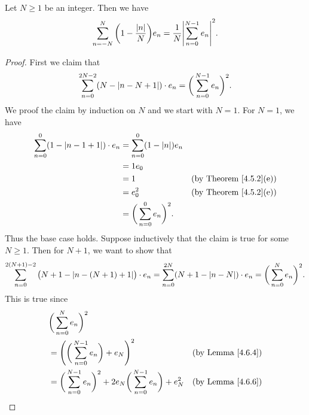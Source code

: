 \begin{additional corollary}\label{ac 5.4.2}
Let \(N \geq 1\) be an integer.
Then we have
\[
    \sum_{n = -N}^N \bigg(1 - \frac{\abs*{n}}{N}\bigg) e_n = \frac{1}{N} \abs*{\sum_{n = 0}^{N - 1} e_n}^2.
\]
\end{additional corollary}

\begin{proof}
    First we claim that
    \[
        \sum_{n = 0}^{2N - 2} (N - \abs*{n - N + 1}) \cdot e_n = \bigg(\sum_{n = 0}^{N - 1} e_n\bigg)^2.
    \]
    We proof the claim by induction on \(N\) and we start with \(N = 1\).
    For \(N = 1\), we have
    \begin{align*}
        \sum_{n = 0}^0 (1 - \abs*{n - 1 + 1}) \cdot e_n & = \sum_{n = 0}^0 (1 - \abs*{n}) e_n                                      \\
                                                        & = 1 e_0                                                                  \\
                                                        & = 1                                 & \text{(by Theorem \ref{4.5.2}(e))} \\
                                                        & = e_0^2                             & \text{(by Theorem \ref{4.5.2}(e))} \\
                                                        & = \bigg(\sum_{n = 0}^0 e_n\bigg)^2.
    \end{align*}
    Thus the base case holds.
    Suppose inductively that the claim is true for some \(N \geq 1\).
    Then for \(N + 1\), we want to show that
    \[
        \sum_{n = 0}^{2(N + 1) - 2} \big(N + 1 - \abs*{n - (N + 1) + 1}\big) \cdot e_n = \sum_{n = 0}^{2N} (N + 1 - \abs*{n - N}) \cdot e_n = \bigg(\sum_{n = 0}^N e_n\bigg)^2.
    \]
    This is true since
    \begin{align*}
         & \bigg(\sum_{n = 0}^N e_n\bigg)^2                                                                                                                                  \\
         & = \Bigg(\bigg(\sum_{n = 0}^{N - 1} e_n\bigg) + e_N\Bigg)^2                                                                     & \text{(by Lemma \ref{4.6.4})}    \\
         & = \bigg(\sum_{n = 0}^{N - 1} e_n\bigg)^2 + 2 e_N \bigg(\sum_{n = 0}^{N - 1} e_n\bigg) + e_N^2                                  & \text{(by Lemma \ref{4.6.6})}    \\

\end{align*}
\end{proof}
